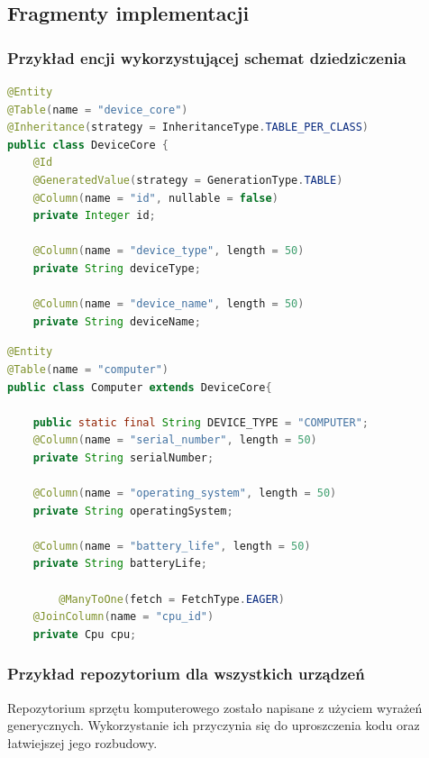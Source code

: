 \subsection{Fragmenty implementacji}
\subsubsection {Przykład encji wykorzystującej schemat dziedziczenia}

\begin{lstlisting}[language=Java, style=JavaStyle, caption={Fragment klasy nadrzędnej DeviceCore}, label={entity_deviceCore}]
@Entity
@Table(name = "device_core")
@Inheritance(strategy = InheritanceType.TABLE_PER_CLASS)
public class DeviceCore {
    @Id
    @GeneratedValue(strategy = GenerationType.TABLE)
    @Column(name = "id", nullable = false)
    private Integer id;

    @Column(name = "device_type", length = 50)
    private String deviceType;

    @Column(name = "device_name", length = 50)
    private String deviceName;

\end{lstlisting}


\begin{lstlisting}[language=Java, style=JavaStyle,  caption={Fragment klasy potomnej Computer}, label={entity_computer}]
@Entity
@Table(name = "computer")
public class Computer extends DeviceCore{

    public static final String DEVICE_TYPE = "COMPUTER";
    @Column(name = "serial_number", length = 50)
    private String serialNumber;

    @Column(name = "operating_system", length = 50)
    private String operatingSystem;

    @Column(name = "battery_life", length = 50)
    private String batteryLife;
		
		@ManyToOne(fetch = FetchType.EAGER)
    @JoinColumn(name = "cpu_id")
    private Cpu cpu;

\end{lstlisting}


\subsubsection{Przykład repozytorium dla wszystkich urządzeń}
Repozytorium sprzętu komputerowego zostało napisane z użyciem wyrażeń generycznych. Wykorzystanie ich przyczynia się do uproszczenia kodu oraz łatwiejszej jego rozbudowy.

